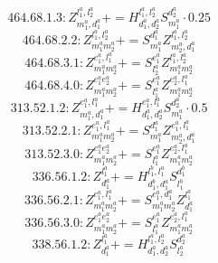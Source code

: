 \documentclass[letterpaper,10pt,fleqn,leqno,onecolumn]{article}
\begin{document}
\begin{equation} \;\;\;\;\;\;  464.68.1.3: Z^{l_{1}^{a},l_{2}^{a}}_{m_{1}^{a},d_{1}^{a}}+=H^{l_{1}^{a},l_{2}^{a}}_{d_{1}^{a},d_{2}^{a}}S^{d_{2}^{a}}_{m_{1}^{a}}\cdot 0.25 \end{equation}
\begin{equation} \;\;\;\;\;\;  464.68.2.2: Z^{l_{1}^{a},l_{2}^{a}}_{m_{1}^{a}m_{2}^{a}}+=S^{d_{1}^{a}}_{m_{1}^{a}}Z^{l_{1}^{a},l_{2}^{a}}_{m_{2}^{a},d_{1}^{a}} \end{equation}
\begin{equation} \;\;\;\;\;\;  464.68.3.1: Z^{e_{1}^{a},l_{1}^{a}}_{m_{1}^{a}m_{2}^{a}}+=S^{e_{1}^{a}}_{l_{2}^{a}}Z^{l_{1}^{a},l_{2}^{a}}_{m_{1}^{a}m_{2}^{a}} \end{equation}
\begin{equation} \;\;\;\;\;\;  464.68.4.0: Z^{e_{1}^{a}e_{2}^{a}}_{m_{1}^{a}m_{2}^{a}}+=S^{e_{1}^{a}}_{l_{1}^{a}}Z^{e_{2}^{a},l_{1}^{a}}_{m_{1}^{a}m_{2}^{a}} \end{equation}
\begin{equation} \;\;\;\;\;\;  313.52.1.2: Z^{e_{1}^{a},l_{1}^{a}}_{m_{1}^{a},d_{1}^{a}}+=H^{e_{1}^{a},l_{1}^{a}}_{d_{1}^{a},d_{2}^{a}}S^{d_{2}^{a}}_{m_{1}^{a}}\cdot 0.5 \end{equation}
\begin{equation} \;\;\;\;\;\;  313.52.2.1: Z^{e_{1}^{a},l_{1}^{a}}_{m_{1}^{a}m_{2}^{a}}+=S^{d_{1}^{a}}_{m_{1}^{a}}Z^{e_{1}^{a},l_{1}^{a}}_{m_{2}^{a},d_{1}^{a}} \end{equation}
\begin{equation} \;\;\;\;\;\;  313.52.3.0: Z^{e_{1}^{a}e_{2}^{a}}_{m_{1}^{a}m_{2}^{a}}+=S^{e_{1}^{a}}_{l_{1}^{a}}Z^{e_{2}^{a},l_{1}^{a}}_{m_{1}^{a}m_{2}^{a}} \end{equation}
\begin{equation} \;\;\;\;\;\;  336.56.1.2: Z^{l_{1}^{a}}_{d_{1}^{a}}+=H^{l_{1}^{b},l_{1}^{a}}_{d_{1}^{b},d_{1}^{a}}S^{d_{1}^{b}}_{l_{1}^{b}} \end{equation}
\begin{equation} \;\;\;\;\;\;  336.56.2.1: Z^{e_{1}^{a},l_{1}^{a}}_{m_{1}^{a}m_{2}^{a}}+=S^{e_{1}^{a},d_{1}^{a}}_{m_{1}^{a}m_{2}^{a}}Z^{l_{1}^{a}}_{d_{1}^{a}} \end{equation}
\begin{equation} \;\;\;\;\;\;  336.56.3.0: Z^{e_{1}^{a}e_{2}^{a}}_{m_{1}^{a}m_{2}^{a}}+=S^{e_{1}^{a}}_{l_{1}^{a}}Z^{e_{2}^{a},l_{1}^{a}}_{m_{1}^{a}m_{2}^{a}} \end{equation}
\begin{equation} \;\;\;\;\;\;  338.56.1.2: Z^{l_{1}^{a}}_{d_{1}^{a}}+=H^{l_{1}^{a},l_{2}^{a}}_{d_{1}^{a},d_{2}^{a}}S^{d_{2}^{a}}_{l_{2}^{a}} \end{equation}
\end{document}
